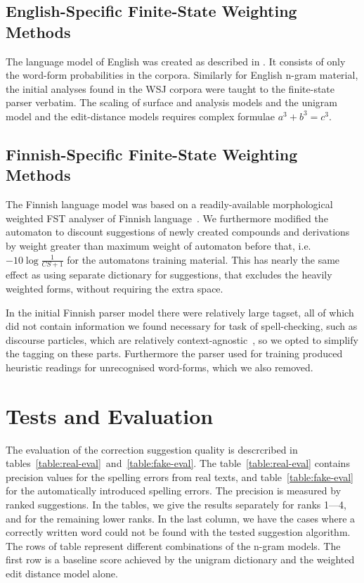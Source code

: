 \documentclass[11pt,a4paper]{article}
\begin{document}
\subsection{English-Specific Finite-State Weighting Methods}

The language model of English was created as described in .
It consists of only the word-form probabilities in the corpora. Similarly for
English n-gram material, the initial analyses found in the WSJ corpora were
taught to the finite-state parser verbatim. The scaling of surface and analysis
models and the unigram model and the edit-distance models requires complex
formulae $a^3 + b^3 = c^3$.


\subsection{Finnish-Specific Finite-State Weighting Methods}

The Finnish language model was based on a readily-available morphological
weighted FST analyser of Finnish language~\cite{pirinen/2008}.  We furthermore
modified the automaton to discount suggestions of newly created compounds and
derivations by weight greater than maximum weight of automaton before that,
i.e. $-10\log\frac{1}{CS+1}$ for the automatons training material. This has
nearly the same effect as using separate dictionary for suggestions, that
excludes the heavily weighted forms, without requiring the extra space.

In the initial Finnish parser model there were relatively large tagset, all of
which did not contain information we found necessary for task of
spell-checking, such as discourse particles, which are relatively
context-agnostic~\cite{visk}, so we opted to simplify the tagging on these
parts. Furthermore the parser used for training produced heuristic readings for
unrecognised word-forms, which we also removed.

\section{Tests and Evaluation}
\label{sec:evaluation}

The evaluation of the correction suggestion quality is descrcribed in
tables~\ref{table:real-eval}~and~\ref{table:fake-eval}. The
table~\ref{table:real-eval} contains precision values for the spelling errors
from real texts, and table~\ref{table:fake-eval} for the automatically
introduced spelling errors. The precision is measured by ranked suggestions. In
the tables, we give the results separately for ranks 1---4, and for the
remaining lower ranks.  In the last column, we have the cases where a correctly
written word could not be found with the tested suggestion algorithm.  The rows
of table represent different combinations of the n-gram models. The first row
is a baseline score achieved by the unigram dictionary and the weighted edit
distance model alone.
\end{document}
